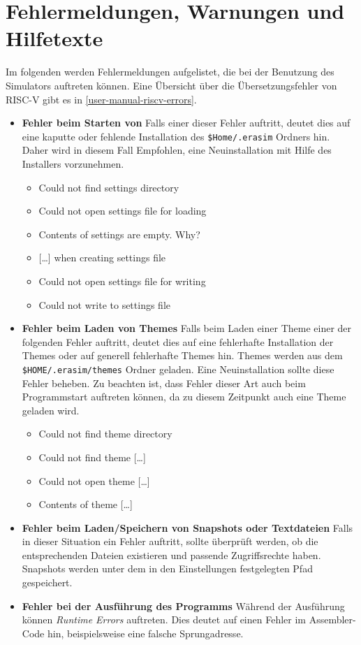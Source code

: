 
\section{Fehlermeldungen, Warnungen und Hilfetexte}

Im folgenden werden Fehlermeldungen aufgelistet, die bei der Benutzung des Simulators auftreten können.
Eine Übersicht über die Übersetzungsfehler von RISC-V gibt es in \autoref{user-manual-riscv-errors}.

\begin{itemize}
    \item \textbf{Fehler beim Starten von \erasim} Falls einer dieser Fehler
    auftritt, deutet dies auf eine kaputte oder fehlende Installation des
    \texttt{\$Home/.erasim} Ordners hin. Daher wird in diesem Fall Empfohlen,
    eine Neuinstallation mit Hilfe des Installers vorzunehmen.
        \begin{itemize}
            \item Could not find settings directory
            \item Could not open settings file for loading
            \item Contents of settings are empty. Why?
            \item {[\dots]} when creating settings file
            \item Could not open settings file for writing
            \item Could not write to settings file
        \end{itemize}
    \item \textbf{Fehler beim Laden von Themes} Falls beim Laden einer Theme
    einer der folgenden Fehler auftritt, deutet dies auf eine fehlerhafte
    Installation der Themes oder auf generell fehlerhafte Themes hin. Themes
    werden aus dem \texttt{\$HOME/.erasim/themes} Ordner geladen. Eine
    Neuinstallation sollte diese Fehler beheben. Zu beachten ist, dass Fehler
    dieser Art auch beim Programmstart auftreten können, da zu diesem Zeitpunkt
    auch eine Theme geladen wird.
        \begin{itemize}
            \item Could not find theme directory
            \item Could not find theme {[\dots]}
            \item Could not open theme {[\dots]}
            \item Contents of theme {[\dots]}
        \end{itemize}
    \item \textbf{Fehler beim Laden/Speichern von Snapshots oder Textdateien}
    Falls in dieser Situation ein Fehler auftritt, sollte überprüft werden, ob
    die entsprechenden Dateien existieren und passende Zugriffsrechte haben.
    Snapshots werden unter dem in den Einstellungen festgelegten Pfad
    gespeichert.
    \item \textbf{Fehler bei der Ausführung des Programms} Während der
    Ausführung können \emph{Runtime Errors} auftreten. Dies deutet auf einen
    Fehler im Assembler-Code hin, beispielsweise eine falsche Sprungadresse.
\end{itemize}
